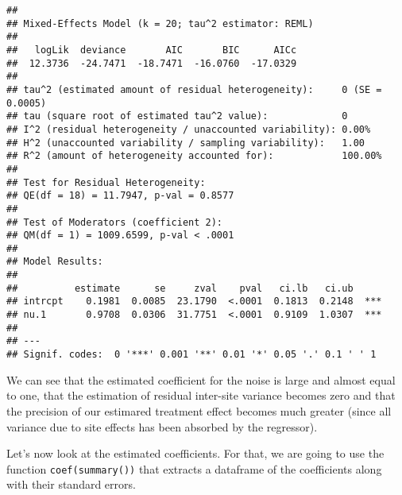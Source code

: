 \documentclass[
]{book}
\theoremstyle{definition}
\theoremstyle{definition}
\theoremstyle{definition}
\theoremstyle{definition}
\theoremstyle{remark}
\begin{document}
\begin{verbatim}
## 
## Mixed-Effects Model (k = 20; tau^2 estimator: REML)
## 
##   logLik  deviance       AIC       BIC      AICc 
##  12.3736  -24.7471  -18.7471  -16.0760  -17.0329   
## 
## tau^2 (estimated amount of residual heterogeneity):     0 (SE = 0.0005)
## tau (square root of estimated tau^2 value):             0
## I^2 (residual heterogeneity / unaccounted variability): 0.00%
## H^2 (unaccounted variability / sampling variability):   1.00
## R^2 (amount of heterogeneity accounted for):            100.00%
## 
## Test for Residual Heterogeneity:
## QE(df = 18) = 11.7947, p-val = 0.8577
## 
## Test of Moderators (coefficient 2):
## QM(df = 1) = 1009.6599, p-val < .0001
## 
## Model Results:
## 
##          estimate      se     zval    pval   ci.lb   ci.ub 
## intrcpt    0.1981  0.0085  23.1790  <.0001  0.1813  0.2148  *** 
## nu.1       0.9708  0.0306  31.7751  <.0001  0.9109  1.0307  *** 
## 
## ---
## Signif. codes:  0 '***' 0.001 '**' 0.01 '*' 0.05 '.' 0.1 ' ' 1
\end{verbatim}

We can see that the estimated coefficient for the noise is large and almost equal to one, that the estimation of residual inter-site variance becomes zero and that the precision of our estimared treatment effect becomes much greater (since all variance due to site effects has been absorbed by the regressor).

Let's now look at the estimated coefficients.
For that, we are going to use the function \texttt{coef(summary())} that extracts a dataframe of the coefficients along with their standard errors.
\end{document}
